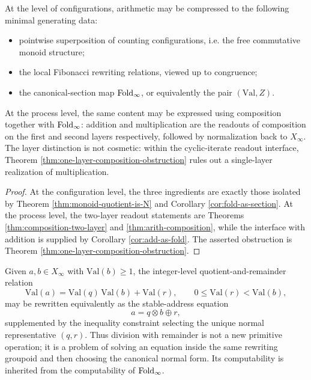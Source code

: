 \begin{corollary}\label{cor:primitive-free-arith}
At the level of configurations, arithmetic may be compressed to the following minimal generating data:
\begin{itemize}
  \item pointwise superposition of counting configurations, i.e. the free commutative monoid structure;
  \item the local Fibonacci rewriting relations, viewed up to congruence;
  \item the canonical-section map \(\operatorname{Fold}_\infty\), or equivalently the pair \((\mathrm{Val},Z)\).
\end{itemize}
At the process level, the same content may be expressed using composition together with \(\operatorname{Fold}_\infty\): addition and multiplication are the readouts of composition on the first and second layers respectively, followed by normalization back to \(X_\infty\). The layer distinction is not cosmetic: within the cyclic-iterate readout interface, Theorem \ref{thm:one-layer-composition-obstruction} rules out a single-layer realization of multiplication.
\end{corollary}

\begin{proof}
At the configuration level, the three ingredients are exactly those isolated by Theorem \ref{thm:monoid-quotient-is-N} and Corollary \ref{cor:fold-as-section}. At the process level, the two-layer readout statements are Theorems \ref{thm:composition-two-layer} and \ref{thm:arith-composition}, while the interface with addition is supplied by Corollary \ref{cor:add-as-fold}. The asserted obstruction is Theorem \ref{thm:one-layer-composition-obstruction}.
\end{proof}

\begin{remark}\label{rem:division-as-selection}
Given \(a,b\in X_\infty\) with \(\mathrm{Val}(b)\ge 1\), the integer-level quotient-and-remainder relation
\[
\mathrm{Val}(a)=\mathrm{Val}(q)\,\mathrm{Val}(b)+\mathrm{Val}(r),
\qquad
0\le \mathrm{Val}(r)<\mathrm{Val}(b),
\]
may be rewritten equivalently as the stable-address equation
\[
a=q\otimes b\oplus r,
\]
supplemented by the inequality constraint selecting the unique normal representative \((q,r)\). Thus division with remainder is not a new primitive operation; it is a problem of solving an equation inside the same rewriting groupoid and then choosing the canonical normal form. Its computability is inherited from the computability of \(\operatorname{Fold}_\infty\).
\end{remark}

